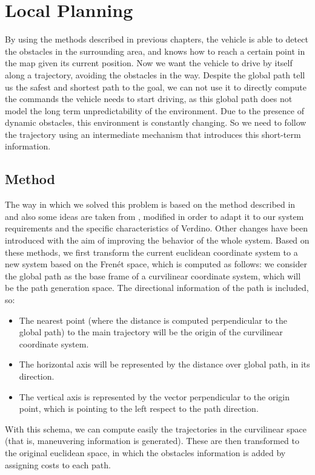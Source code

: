 
\graphicspath{{./images/chapter07/bmps/}{./images/chapter07/vects/}{./images/chapter07/}}

\chapter{Local Planning}\label{ch:chapter07}

By using the methods described in previous chapters, the vehicle is able to detect the obstacles in the surrounding area, and knows how to reach a certain point in the map given its current position. Now we want the vehicle to drive by itself along a trajectory, avoiding the obstacles in the way.
Despite the global path tell us the safest and shortest path to the goal, we can not use it to directly compute the commands the vehicle needs to start driving, as this global path does not model the long term unpredictability of the environment. Due to the presence of dynamic obstacles, this environment is constantly changing. So we need to follow the trajectory using an intermediate mechanism that introduces this short-term information.

\section{Method}\label{ch:chapter07_01}

The way in which we solved this problem is based on the method described in \cite{chu2012local} and also some ideas are taken from \cite{thrun2006stanley}, modified in order to adapt it to our system requirements and the specific characteristics of Verdino. Other changes have been introduced with the aim of improving the behavior of the whole system. Based on these methods, we first transform the current euclidean coordinate system to a new system based on the Frenét space, which is computed as follows: we consider the global path  as the base frame of a curvilinear coordinate system, which will be the path generation space. The directional information of the path is included, so:
\begin{itemize}
 \item The nearest point (where the distance is computed perpendicular to the global path) to the main trajectory will be the origin of the curvilinear coordinate system.
 \item The horizontal axis will be represented by the distance over global path, in its direction.
 \item The vertical axis is represented by the vector perpendicular to the origin point, which is pointing to the left respect to the path direction.
\end{itemize}
With this schema, we can compute easily the trajectories in the curvilinear space (that is, maneuvering information is generated). These are then transformed to the original euclidean space, in which the obstacles information is added by assigning costs to each path.

